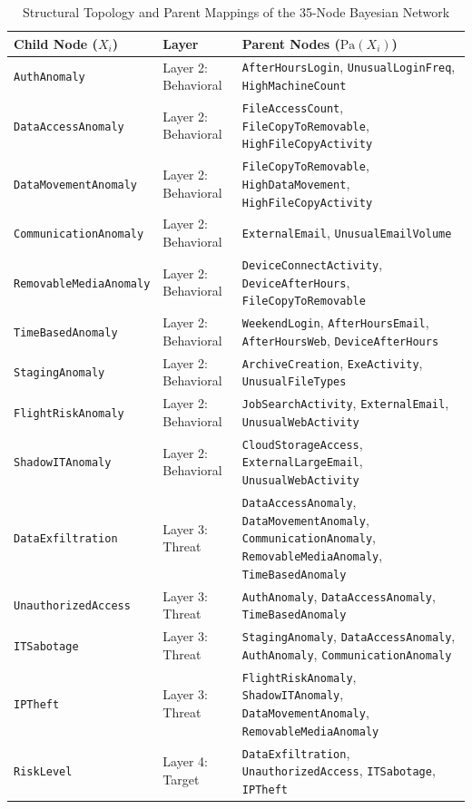 \documentclass[12pt,a4paper]{report}
\begin{document}
\begin{table}[H]
\centering
\caption{Structural Topology and Parent Mappings of the 35-Node Bayesian Network}
\label{tab:dag_parents}
\fontsize{9}{11}\selectfont
\begin{tabularx}{\textwidth}{p{}p{}X}
\toprule
\textbf{Child Node ($X_i$)} & \textbf{Layer} & \textbf{Parent Nodes ($\text{Pa}(X_i)$)} \\
\midrule
\texttt{AuthAnomaly} & Layer 2: Behavioral & \texttt{AfterHoursLogin}, \texttt{UnusualLoginFreq}, \texttt{HighMachineCount} \\
\texttt{DataAccessAnomaly} & Layer 2: Behavioral & \texttt{FileAccessCount}, \texttt{FileCopyToRemovable}, \texttt{HighFileCopyActivity} \\
\texttt{DataMovementAnomaly} & Layer 2: Behavioral & \texttt{FileCopyToRemovable}, \texttt{HighDataMovement}, \texttt{HighFileCopyActivity} \\
\texttt{CommunicationAnomaly}& Layer 2: Behavioral & \texttt{ExternalEmail}, \texttt{UnusualEmailVolume} \\
\texttt{RemovableMediaAnomaly}& Layer 2: Behavioral & \texttt{DeviceConnectActivity}, \texttt{DeviceAfterHours}, \texttt{FileCopyToRemovable} \\
\texttt{TimeBasedAnomaly} & Layer 2: Behavioral & \texttt{WeekendLogin}, \texttt{AfterHoursEmail}, \texttt{AfterHoursWeb}, \texttt{DeviceAfterHours} \\
\texttt{StagingAnomaly} & Layer 2: Behavioral & \texttt{ArchiveCreation}, \texttt{ExeActivity}, \texttt{UnusualFileTypes} \\
\texttt{FlightRiskAnomaly} & Layer 2: Behavioral & \texttt{JobSearchActivity}, \texttt{ExternalEmail}, \texttt{UnusualWebActivity} \\
\texttt{ShadowITAnomaly} & Layer 2: Behavioral & \texttt{CloudStorageAccess}, \texttt{ExternalLargeEmail}, \texttt{UnusualWebActivity} \\
\midrule
\texttt{DataExfiltration} & Layer 3: Threat & \texttt{DataAccessAnomaly}, \texttt{DataMovementAnomaly}, \texttt{CommunicationAnomaly}, \texttt{RemovableMediaAnomaly}, \texttt{TimeBasedAnomaly} \\
\texttt{UnauthorizedAccess} & Layer 3: Threat & \texttt{AuthAnomaly}, \texttt{DataAccessAnomaly}, \texttt{TimeBasedAnomaly} \\
\texttt{ITSabotage} & Layer 3: Threat & \texttt{StagingAnomaly}, \texttt{DataAccessAnomaly}, \texttt{AuthAnomaly}, \texttt{CommunicationAnomaly} \\
\texttt{IPTheft} & Layer 3: Threat & \texttt{FlightRiskAnomaly}, \texttt{ShadowITAnomaly}, \texttt{DataMovementAnomaly}, \texttt{RemovableMediaAnomaly} \\
\midrule
\texttt{RiskLevel} & Layer 4: Target & \texttt{DataExfiltration}, \texttt{UnauthorizedAccess}, \texttt{ITSabotage}, \texttt{IPTheft} \\
\bottomrule
\end{tabularx}
\end{table}
\end{document}
